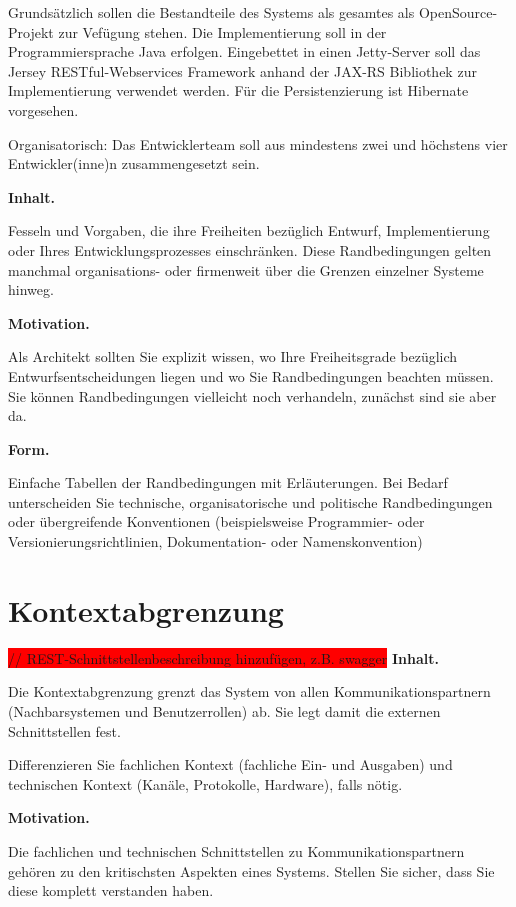 \documentclass[]{article}
\begin{document}
Grundsätzlich sollen die Bestandteile des Systems als gesamtes als OpenSource-Projekt zur Vefügung stehen. Die Implementierung soll in der Programmiersprache Java erfolgen. Eingebettet in einen Jetty-Server soll das Jersey RESTful-Webservices Framework anhand der JAX-RS Bibliothek zur Implementierung verwendet werden. 
Für die Persistenzierung ist Hibernate vorgesehen.

Organisatorisch: Das Entwicklerteam soll aus mindestens zwei und höchstens vier Entwickler(inne)n zusammengesetzt sein.

\textbf{Inhalt.}

Fesseln und Vorgaben, die ihre Freiheiten bezüglich Entwurf,
Implementierung oder Ihres Entwicklungsprozesses einschränken. Diese
Randbedingungen gelten manchmal organisations- oder firmenweit über die
Grenzen einzelner Systeme hinweg.

\textbf{Motivation.}

Als Architekt sollten Sie explizit wissen, wo Ihre Freiheitsgrade
bezüglich Entwurfsentscheidungen liegen und wo Sie Randbedingungen
beachten müssen. Sie können Randbedingungen vielleicht noch verhandeln,
zunächst sind sie aber da.

\textbf{Form.}

Einfache Tabellen der Randbedingungen mit Erläuterungen. Bei Bedarf
unterscheiden Sie technische, organisatorische und politische
Randbedingungen oder übergreifende Konventionen (beispielsweise
Programmier- oder Versionierungsrichtlinien, Dokumentation- oder
Namenskonvention)

\section{Kontextabgrenzung}\label{section-system-scope-and-context}

\colorbox{red} {// REST-Schnittstellenbeschreibung hinzufügen, z.B. swagger}
\textbf{Inhalt.}

Die Kontextabgrenzung grenzt das System von allen Kommunikationspartnern
(Nachbarsystemen und Benutzerrollen) ab. Sie legt damit die externen
Schnittstellen fest.

Differenzieren Sie fachlichen Kontext (fachliche Ein- und Ausgaben) und
technischen Kontext (Kanäle, Protokolle, Hardware), falls nötig.

\textbf{Motivation.}

Die fachlichen und technischen Schnittstellen zu Kommunikationspartnern
gehören zu den kritischsten Aspekten eines Systems. Stellen Sie sicher,
dass Sie diese komplett verstanden haben.
\end{document}
